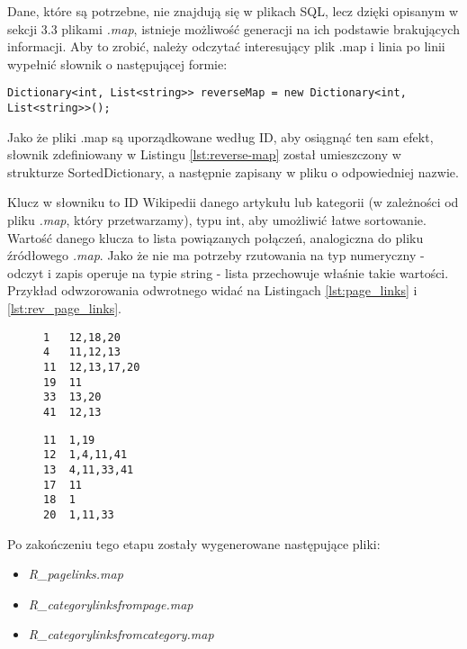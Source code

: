 Dane, które są potrzebne, nie znajdują się w plikach SQL, lecz dzięki opisanym w sekcji 3.3 plikami \textit{.map}, istnieje możliwość generacji na ich podstawie brakujących informacji. Aby to zrobić, należy odczytać interesujący plik .map i linia po linii wypełnić słownik o następującej formie:

\begin{lstlisting}[caption={Słownik przechowujący odwzorowanie odwrotne}, label=lst:reverse-map]
Dictionary<int, List<string>> reverseMap = new Dictionary<int, List<string>>();
\end{lstlisting}

Jako że pliki .map są uporządkowane według ID, aby osiągnąć ten sam efekt, słownik zdefiniowany w Listingu \ref{lst:reverse-map} został umieszczony w strukturze SortedDictionary, a następnie zapisany w pliku o odpowiedniej nazwie. 

Klucz w słowniku to ID Wikipedii danego artykułu lub kategorii (w zależności od pliku \textit{.map}, który przetwarzamy), typu int, aby umożliwić łatwe sortowanie. Wartość danego klucza to lista powiązanych połączeń, analogiczna do pliku źródłowego \textit{.map}. Jako że nie ma potrzeby rzutowania na typ numeryczny - odczyt i zapis operuje na typie string - lista przechowuje właśnie takie wartości. Przykład odwzorowania odwrotnego widać na Listingach \ref{lst:page_links} i \ref{lst:rev_page_links}.

\begin{figure}[!h]
\begin{center}
    \begin{minipage}[c]{0.45\linewidth}
        \begin{lstlisting}[frame=single,caption={Przykładowy fragment pliku pagelinks.map},label=lst:page_links]
1   12,18,20
4   11,12,13
11  12,13,17,20
19  11
33  13,20
41  12,13
\end{lstlisting}
    \end{minipage}
    \hspace{1em}
    \begin{minipage}[c]{0.45\linewidth}
        \begin{lstlisting}[frame=single,caption={Odwzorowanie odwrotne z Listingu \ref{lst:page_links} (fragment R\_pagelinks.map)},label=lst:rev_page_links]
11  1,19
12  1,4,11,41
13  4,11,33,41
17  11
18  1
20  1,11,33
\end{lstlisting}
\end{minipage}
\end{center}
\end{figure}
Po zakończeniu tego etapu zostały wygenerowane następujące pliki:
\begin{itemize}
    \item \textit{R\_pagelinks.map}
    \item \textit{R\_categorylinksfrompage.map}
    \item \textit{R\_categorylinksfromcategory.map}
\end{itemize}

